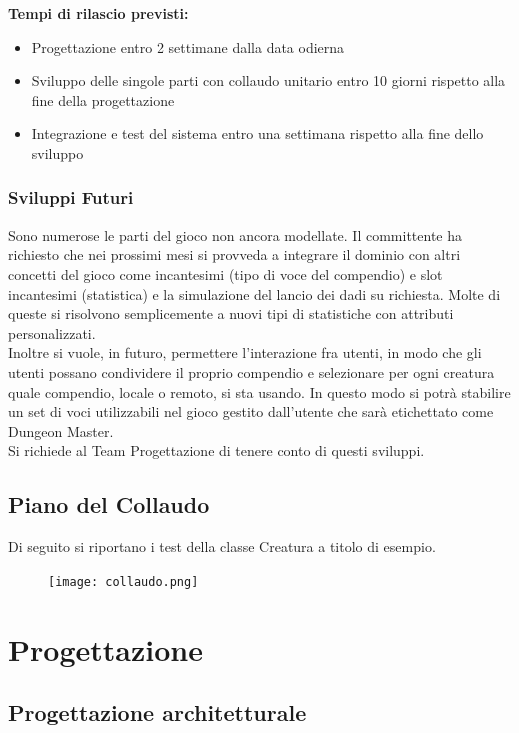 \documentclass[a4paper, 11pt]{article}
\begin{document}
\textbf{Tempi di rilascio previsti:}
\begin{itemize}
    \item Progettazione entro 2 settimane dalla data odierna
    \item Sviluppo delle singole parti con collaudo unitario entro 10 giorni rispetto alla fine della progettazione
    \item Integrazione e test del sistema entro una settimana rispetto alla fine dello sviluppo
\end{itemize}

\subsubsection{Sviluppi Futuri}
Sono numerose le parti del gioco non ancora modellate. Il committente ha richiesto che nei prossimi mesi si provveda a integrare il dominio con altri concetti del gioco  come incantesimi (tipo di voce del compendio) e slot incantesimi (statistica) e la simulazione del lancio dei dadi su richiesta. Molte di queste si risolvono semplicemente a nuovi tipi di statistiche con attributi personalizzati. \\
Inoltre si vuole, in futuro, permettere l'interazione fra utenti, in modo che gli utenti possano condividere il proprio compendio e selezionare per ogni creatura quale compendio, locale o remoto, si sta usando. In questo modo si potrà stabilire un set di voci utilizzabili nel gioco gestito dall'utente che sarà etichettato come Dungeon Master.\\
Si richiede al Team Progettazione di tenere conto di questi sviluppi.

\clearpage \newpage
\subsection{Piano del Collaudo}
Di seguito si riportano i test della classe Creatura a titolo di esempio.
\vspace{1em}
\begin{figure}[h!]
    \centering
    \texttt{[image: collaudo.png]}
    \label{fig:collaudo}
\end{figure}

\newpage
\section{Progettazione}
\subsection{Progettazione architetturale}
\end{document}
